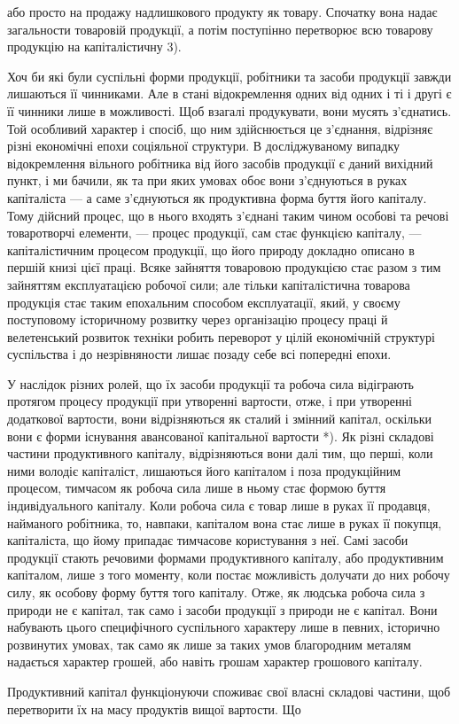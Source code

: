 або просто на продажу надлишкового продукту як товару. Спочатку
вона надає загальности товаровій продукції, а потім поступінно перетворює
всю товарову продукцію на капіталістичну 3).

Хоч би які були суспільні форми продукції, робітники та засоби продукції
завжди лишаються її чинниками. Але в стані відокремлення одних
від одних і ті і другі є її чинники лише в можливості. Щоб взагалі
продукувати, вони мусять з’єднатись. Той особливий характер і спосіб,
що ним здійснюється це з’єднання, відрізняє різні економічні епохи соціяльної
структури. В досліджуваному випадку відокремлення вільного
робітника від його засобів продукції є даний вихідний пункт, і ми
бачили, як та при яких умовах обоє вони з’єднуються в руках капіталіста —
а саме з’єднуються як продуктивна форма буття його капіталу. Тому
дійсний процес, що в нього входять з’єднані таким чином особові та
речові товаротворчі елементи, — процес продукції, сам стає функцією капіталу,
— капіталістичним процесом продукції, що його природу докладно
описано в першій книзі цієї праці. Всяке зайняття товаровою продукцією
стає разом з тим зайняттям експлуатацією робочої сили; але тільки капіталістична
товарова продукція стає таким епохальним способом експлуатації,
який, у своєму поступовому історичному розвитку через організацію
процесу праці й велетенський розвиток техніки робить переворот
у цілій економічній структурі суспільства і до незрівняности лишає позаду
себе всі попередні епохи.

У наслідок різних ролей, що їх засоби продукції та робоча сила відіграють
протягом процесу продукції при утворенні вартости, отже, і
при утворенні додаткової вартости, вони відрізняються як сталий і
змінний капітал, оскільки вони є форми існування авансованої капітальної
вартости *). Як різні складові частини продуктивного капіталу, відрізняються
вони далі тим, що перші, коли ними володіє капіталіст, лишаються
його капіталом і поза продукційним процесом, тимчасом як робоча сила
лише в ньому стає формою буття індивідуального капіталу. Коли робоча
сила є товар лише в руках її продавця, найманого робітника, то, навпаки,
капіталом вона стає лише в руках її покупця, капіталіста, що
йому припадає тимчасове користування з неї. Самі засоби продукції
стають речовими формами продуктивного капіталу, або продуктивним
капіталом, лише з того моменту, коли постає можливість долучати до
них робочу силу, як особову форму буття того капіталу. Отже,
як людська робоча сила з природи не є капітал, так само і засоби
продукції з природи не є капітал. Вони набувають цього специфічного
суспільного характеру лише в певних, історично розвинутих умовах,
так само як лише за таких умов благородним металям надається характер
грошей, або навіть грошам характер грошового капіталу.

Продуктивний капітал функціонуючи споживає свої власні складові
частини, щоб перетворити їх на масу продуктів вищої вартости. Що
